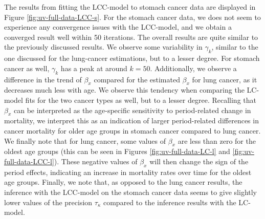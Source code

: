 \newpar The results from fitting the LCC-model to stomach cancer data are displayed in Figure \ref{fig:uv-full-data-LCC-s}. For the stomach cancer data, we \inlabru does not seem to experience any convergence issues with the LCC-model, and we obtain a converged result well within 50 iterations. The overall results are quite similar to the previously discussed results. We observe some variability in $\gamma_k$, similar to the one discussed for the lung-cancer estimations, but to a lesser degree. For stomach cancer as well, $\gamma_k$ has a peak at around $k = 50$. Additionally, we observe a difference in the trend of $\beta_x$ compared for the estimated $\beta_x$ for lung cancer, as it decreases much less with age. We observe this tendency when comparing the LC-model fits for the two cancer types as well, but to a lesser degree. Recalling that $\beta_x$ can be interpreted as the age-specific sensitivity to period-related change in mortality, we interpret this as an indication of larger period-related differences in cancer mortality for older age groups in stomach cancer compared to lung cancer. We finally note that for lung cancer, some values of $\beta_x$ are less than zero for the oldest age groups (this can be seen in Figures \ref{fig:uv-full-data-LC-l} and \ref{fig:uv-full-data-LCC-l}). These negative values of $\beta_x$ will then change the sign of the period effects, indicating an increase in mortality rates over time for the oldest age groups. Finally, we note that, as opposed to the lung cancer results, the inference with the LCC-model on the stomach cancer data seems to give slightly lower values of the precision $\tau_\kappa$ compared to the inference results with the LC-model. 



